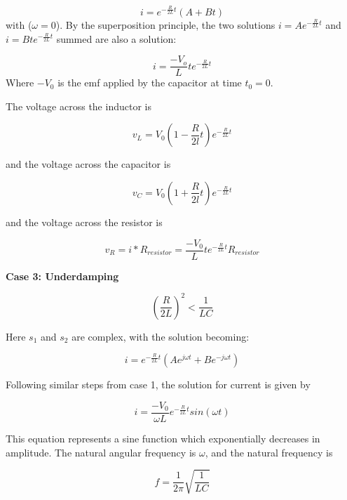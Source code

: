 \documentclass[twocolumn, letterpaper, 10pt, twoside]{article}
\begin{document}
   \begin{equation}
i = e^{-\frac{R}{2L}t}(A + Bt) 
\end{equation}
with ($\omega = 0$).
By the superposition principle, the two solutions $i = Ae^{-\frac{R}{2L}t}$ and $i = Bte^{-\frac{R}{2L}t}$ summed are also a solution:

\begin{equation}
i = \frac{-V_o}{L}te^{-\frac{R}{2L}t}
\end{equation}
Where $-V_0$ is the emf applied by the capacitor at time $t_0 = 0$.

The voltage across the inductor is 

\begin{equation}
v_L = V_0 (1-\frac{R}{2l}t)e^{-\frac{R}{2L}t}
\end{equation}

and the voltage across the capacitor is 

\begin{equation}
v_C = V_0 (1+\frac{R}{2l}t)e^{-\frac{R}{2L}t}
\end{equation}

and the voltage across the resistor is

\begin{equation}
v_R = i * R_{resistor} = \frac{-V_0}{L}te^{-\frac{R}{2L}t}R_{resistor}
\end{equation}

\textbf{{Case 3:} Underdamping}

   \begin{equation}
(\frac{R}{2L})^2 < \frac{1}{LC}
\end{equation}

Here $s_1$ and $s_2$ are complex, with the solution becoming:

   \begin{equation}
i = e^{-\frac{R}{2L}t}(Ae^{j\omega t} + Be^{-j\omega t})
\end{equation}
	
Following similar steps from case 1, the solution for current is given by

\begin{equation}
i = \frac{-V_0}{\omega L}e^{-\frac{R}{2L}t}sin(\omega t)
\end{equation}	

This equation represents a sine function which exponentially decreases in amplitude. The natural angular frequency is $\omega$, and the natural frequency is 

\begin{equation}
f = \frac{1}{2\pi}\sqrt{\frac{1}{LC}}
\end{equation}
\end{document}
